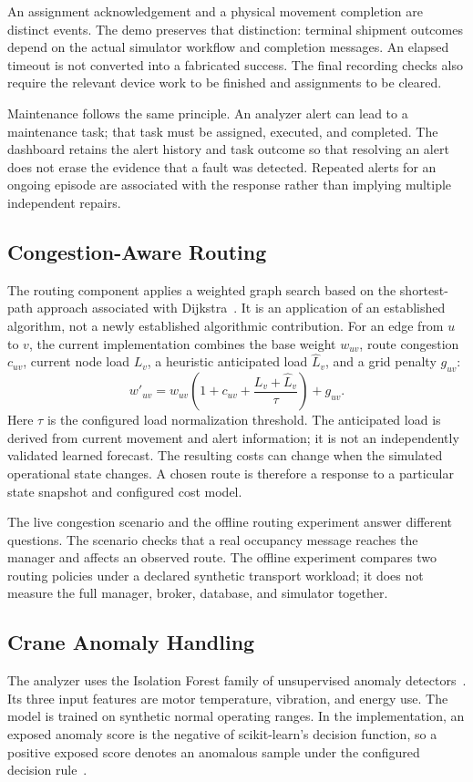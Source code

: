 \documentclass[journal]{IEEEtran}
\begin{document}
An assignment acknowledgement and a physical movement completion are distinct events. The demo preserves that distinction: terminal shipment outcomes depend on the actual simulator workflow and completion messages. An elapsed timeout is not converted into a fabricated success. The final recording checks also require the relevant device work to be finished and assignments to be cleared.

Maintenance follows the same principle. An analyzer alert can lead to a maintenance task; that task must be assigned, executed, and completed. The dashboard retains the alert history and task outcome so that resolving an alert does not erase the evidence that a fault was detected. Repeated alerts for an ongoing episode are associated with the response rather than implying multiple independent repairs.

\subsection{Congestion-Aware Routing}
The routing component applies a weighted graph search based on the shortest-path approach associated with Dijkstra~\citep{dijkstra}. It is an application of an established algorithm, not a newly established algorithmic contribution. For an edge from $u$ to $v$, the current implementation combines the base weight $w_{uv}$, route congestion $c_{uv}$, current node load $L_v$, a heuristic anticipated load $\widehat{L}_v$, and a grid penalty $g_{uv}$:
\begin{equation}
w'_{uv}=w_{uv}\left(1+c_{uv}+\frac{L_v+\widehat{L}_v}{\tau}\right)+g_{uv}.
\label{eq:cost}
\end{equation}
Here $\tau$ is the configured load normalization threshold. The anticipated load is derived from current movement and alert information; it is not an independently validated learned forecast. The resulting costs can change when the simulated operational state changes. A chosen route is therefore a response to a particular state snapshot and configured cost model.

The live congestion scenario and the offline routing experiment answer different questions. The scenario checks that a real occupancy message reaches the manager and affects an observed route. The offline experiment compares two routing policies under a declared synthetic transport workload; it does not measure the full manager, broker, database, and simulator together.

\subsection{Crane Anomaly Handling}
The analyzer uses the Isolation Forest family of unsupervised anomaly detectors~\citep{iforest}. Its three input features are motor temperature, vibration, and energy use. The model is trained on synthetic normal operating ranges. In the implementation, an exposed anomaly score is the negative of scikit-learn's decision function, so a positive exposed score denotes an anomalous sample under the configured decision rule~\citep{sklearn}.
\end{document}
